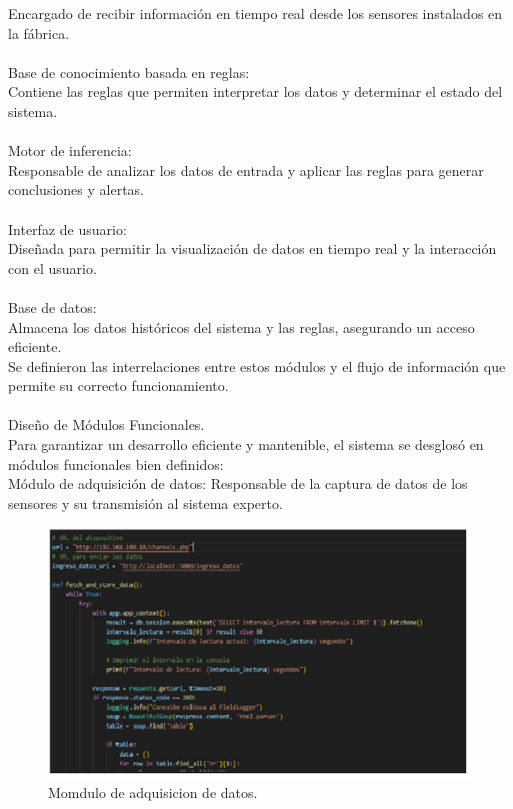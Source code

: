 Encargado de recibir información en tiempo real desde los sensores instalados en la fábrica. \\
\\
Base de conocimiento basada en reglas: \\
Contiene las reglas que permiten interpretar los datos y determinar el estado del sistema. \\
\\
Motor de inferencia: \\
Responsable de analizar los datos de entrada y aplicar las reglas para generar conclusiones y alertas. \\
\\

Interfaz de usuario:\\
Diseñada para permitir la visualización de datos en tiempo real y la interacción con el usuario. \\
\\
Base de datos:\\

Almacena los datos históricos del sistema y las reglas, asegurando un acceso eficiente. \\
Se definieron las interrelaciones entre estos módulos y el flujo de información que permite su correcto funcionamiento. \\
\\
Diseño de Módulos Funcionales. \\
Para garantizar un desarrollo eficiente y mantenible, el sistema se desglosó en módulos funcionales bien definidos: \\
Módulo de adquisición de datos: Responsable de la captura de datos de los sensores y su transmisión al sistema experto. \\

\begin{figure}[H]
    \begin{center}
    \includegraphics[scale = .5]{./images/Modulo de adquisicion de datos.png}
    \caption{Momdulo de adquisicion de datos.}
    \label{fig:huella}
    \end{center}
    \end{figure}


